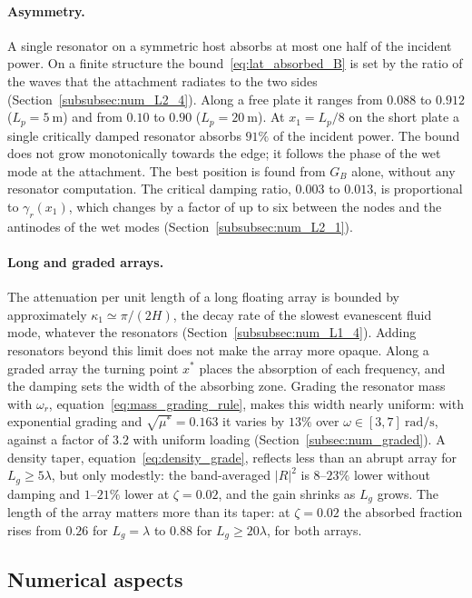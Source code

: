 {\paragraph{Asymmetry.} A single resonator on a symmetric host absorbs at most one half of the incident power. On a finite structure the bound~\eqref{eq:lat_absorbed_B} is set by the ratio of the waves that the attachment radiates to the two sides (Section~\ref{subsubsec:num_L2_4}). Along a free plate it ranges from $0.088$ to $0.912$ ($L_p=5~\si{\meter}$) and from $0.10$ to $0.90$ ($L_p=20~\si{\meter}$). At $x_1=L_p/8$ on the short plate a single critically damped resonator absorbs $91\%$ of the incident power. The bound does not grow monotonically towards the edge; it follows the phase of the wet mode at the attachment. The best position is found from $G_B$ alone, without any resonator computation. The critical damping ratio, $0.003$ to $0.013$, is proportional to $\gamma_r(x_1)$, which changes by a factor of up to six between the nodes and the antinodes of the wet modes (Section~\ref{subsubsec:num_L2_1}).

\paragraph{Long and graded arrays.} The attenuation per unit length of a long floating array is bounded by approximately $\kappa_1\simeq\pi/(2H)$, the decay rate of the slowest evanescent fluid mode, whatever the resonators (Section~\ref{subsubsec:num_L1_4}). Adding resonators beyond this limit does not make the array more opaque. Along a graded array the turning point $x^*$ places the absorption of each frequency, and the damping sets the width of the absorbing zone. Grading the resonator mass with $\omega_r$, equation~\eqref{eq:mass_grading_rule}, makes this width nearly uniform: with exponential grading and $\sqrt{\mu^*}=0.163$ it varies by $13\%$ over $\omega\in[3,7]~\si{\radian\per\second}$, against a factor of $3.2$ with uniform loading (Section~\ref{subsec:num_graded}). A density taper, equation~\eqref{eq:density_grade}, reflects less than an abrupt array for $L_g\ge5\lambda$, but only modestly: the band-averaged $|R|^2$ is $8$--$23\%$ lower without damping and $1$--$21\%$ lower at $\zeta=0.02$, and the gain shrinks as $L_g$ grows. The length of the array matters more than its taper: at $\zeta=0.02$ the absorbed fraction rises from $0.26$ for $L_g=\lambda$ to $0.88$ for $L_g\ge20\lambda$, for both arrays.

\subsection{Numerical aspects}\label{subsec:disc_numerics}

}
